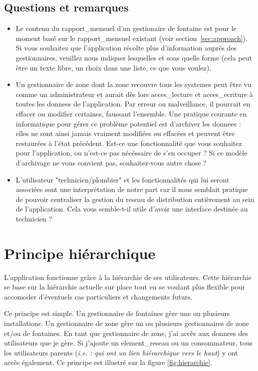 \documentclass[a4paper, 11pt]{article}
\begin{document}
  \subsection{Questions et remarques}
  \begin{itemize}
    \item Le contenu du \gls{rapport_mensuel} d'un gestionaire de \gls{fontaine} est pour le moment basé sur le \gls{rapport_mensuel} existant (voir section~\ref{sec:approach}). Si vous souhaitez que l'\gls{application} récolte plus d'information auprès des gestionnaires, veuillez nous indiquer lesquelles et sous quelle forme (cela peut être un texte libre, un choix dans une liste, ce que vous voulez).
    \item Un gestionnaire de \gls{zone} dont la \gls{zone} recouvre tous les \gls{systeme}s peut être vu comme un administrateur et aurait dès lors \gls{acces_lecture} et \gls{acces_ecriture} à toutes les \glspl{donnee} de l'\gls{application}. Par erreur ou malveillance, il pourrait en effacer ou modifier certaines, faussant l'ensemble. Une pratique courante en informatique pour gérer ce problème potentiel est d'archiver les \glspl{donnee} : elles ne sont ainsi jamais vraiment modifiées ou effacées et peuvent être restaurées à l'état précédent. Est-ce une fonctionnalité que vous souhaitez pour l'\gls{application}, ou n'est-ce pas nécéssaire de s'en occuper ? Si ce modèle d'archivage ne vous convient pas, souhaitez-vous autre chose ?
    \item L'\gls{utilisateur} "technicien/plombier" et les fonctionnalités qui lui seront associées sont une interprétation de notre part car il nous semblait pratique de pouvoir centraliser la gestion du \gls{reseau} de distribution entièrement au sein de l'\gls{application}. Cela vous semble-t-il utile d'avoir une \gls{interface} destinée au technicien ?
  \end{itemize}

  \section{Principe hiérarchique}
    L'\gls{application} fonctionne grâce à la hiérarchie de ses \glspl{utilisateur}. Cette hiérarchie se base sur la hiérarchie actuelle sur place tout en se voulant plus flexible pour accomoder d'éventuels cas particuliers et changements futurs.

    Ce principe est simple. Un gestionnaire de \glspl{fontaine} gère une ou plusieurs installations. Un gestionnaire de \gls{zone} gère un ou plusieurs gestionnaires de \gls{zone} et/ou de \glspl{fontaine}. En tant que gestionnaire de \gls{zone}, j'ai accès aux \glspl{donnee} des \glspl{utilisateur} que je gère. Si j'ajoute un \gls{element_reseau} ou un \gls{consommateur}, tous les \glspl{utilisateur} parents (\emph{i.e. : qui ont un lien hiérarchique vers le haut}) y ont accès également. Ce principe est illustré sur la figure \ref{fig:hierarchie}.
\end{document}
